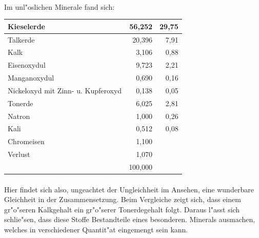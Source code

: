 \documentclass[a4paper, 11pt, oneside]{article}
\begin{document}
\paragraph{}
Im unl"oslichen Minerale fand sich:
\begin{center}
\begin{tabular}{ |p{30mm}|r|r| }
    \hline
    Kieselerde & 56,252 & 29,75\\\hline
    Talkerde & 20,396 & 7,91\\\hline
    Kalk & 3,106 & 0,88\\\hline
    Eisenoxydul & 9,723 & 2,21\\\hline
    Manganoxydul & 0,690 & 0,16\\\hline
    Nickeloxyd mit Zinn- u. Kupferoxyd & 0,138 & 0,05\\\hline
    Tonerde & 6,025 & 2,81\\\hline
    Natron & 1,000 & 0,26\\\hline
    Kali & 0,512 & 0,08\\\hline
    Chromeisen & 1,100 & \\\hline
    Verlust & 1,070 & \\\hline
     & 100,000 & \\
    \hline
\end{tabular}
\end{center}
\paragraph{}
Hier findet sich also, ungeachtet der Ungleichheit im Ansehen, eine wunderbare Gleichheit in der Zusammensetzung. Beim Vergleiche zeigt sich, dass einem gr"o"seren Kalkgehalt ein gr"o"serer Tonerdegehalt folgt. Daraus l"asst sich schlie"sen, dass diese Stoffe Bestandteile eines besonderen. Minerals ausmachen, welches in verschiedener Quantit"at eingemengt sein kann.
\end{document}
